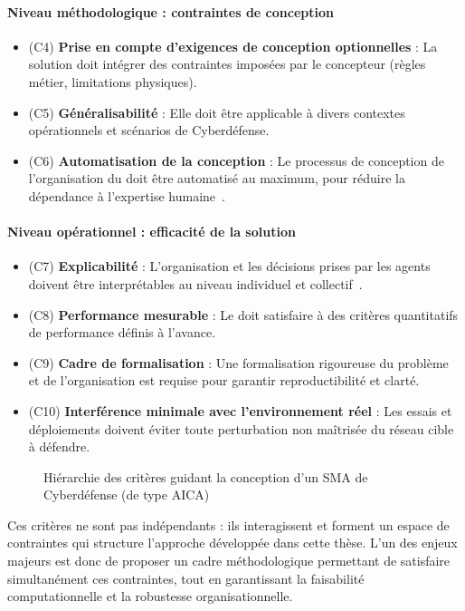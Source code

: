 \paragraph{Niveau méthodologique : contraintes de conception}
\begin{itemize}
    \item (C4) \textbf{Prise en compte d'exigences de conception optionnelles} : La solution doit intégrer des contraintes imposées par le concepteur (règles métier, limitations physiques).
    \item (C5) \textbf{Généralisabilité} : Elle doit être applicable à divers contextes opérationnels et scénarios de Cyberdéfense.
    \item (C6) \textbf{Automatisation de la conception} : Le processus de conception de l'organisation du  doit être automatisé au maximum, pour réduire la dépendance à l'expertise humaine~\cite{Dennis2010}.
\end{itemize}

\paragraph{Niveau opérationnel : efficacité de la solution}
\begin{itemize}
    \item (C7) \textbf{Explicabilité} : L'organisation et les décisions prises par les agents doivent être interprétables au niveau individuel et collectif~\cite{Boella2006}.
    \item (C8) \textbf{Performance mesurable} : Le  doit satisfaire à des critères quantitatifs de performance définis à l'avance.
    \item (C9) \textbf{Cadre de formalisation} : Une formalisation rigoureuse du problème et de l'organisation est requise pour garantir reproductibilité et clarté.
    \item (C10) \textbf{Interférence minimale avec l'environnement réel} : Les essais et déploiements doivent éviter toute perturbation non maîtrisée du réseau cible à défendre.
\end{itemize}

\begin{figure}[h]
    \centering
    \resizebox{\textwidth}{!}{%
        
    }
    \caption{Hiérarchie des critères guidant la conception d'un SMA de Cyberdéfense (de type AICA)}
    \label{fig:criteria}
\end{figure}

Ces critères ne sont pas indépendants : ils interagissent et forment un espace de contraintes qui structure l'approche développée dans cette thèse. L'un des enjeux majeurs est donc de proposer un cadre méthodologique permettant de satisfaire simultanément ces contraintes, tout en garantissant la faisabilité computationnelle et la robustesse organisationnelle.


